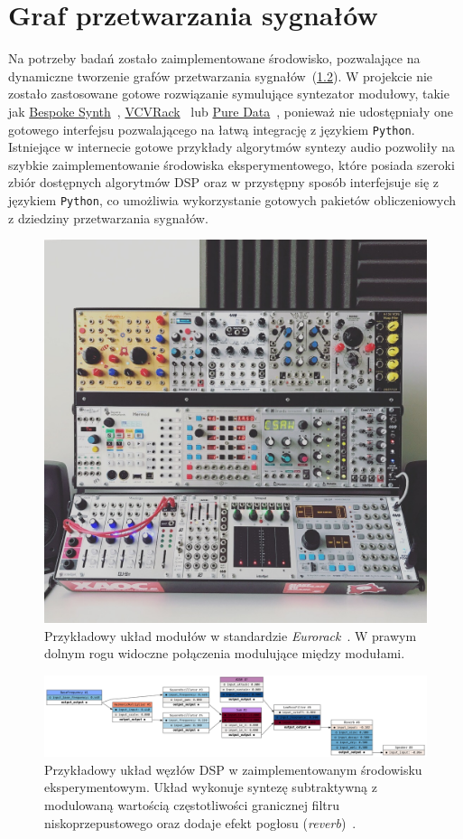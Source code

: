 \chapter{Graf przetwarzania sygnałów} \label{dsp_graph_chapter}

Na potrzeby badań zostało zaimplementowane środowisko, pozwalające na dynamiczne tworzenie grafów przetwarzania
sygnałów~(\ref{fig:example_simple_analog_synth}). W projekcie nie zostało zastosowane gotowe rozwiązanie symulujące syntezator modułowy, takie jak
\href{https://www.bespokesynth.com/}{Bespoke Synth}~\cite{bespoke}, \href{https://vcvrack.com/Rack}{VCVRack}~\cite{vcvrack}
lub \href{https://puredata.info/}{Pure Data}~\cite{pure_data}, ponieważ
nie udostępniały one gotowego interfejsu pozwalającego na łatwą integrację z językiem \texttt{Python}.
Istniejące w internecie gotowe przykłady algorytmów syntezy audio pozwoliły na szybkie zaimplementowanie
środowiska eksperymentowego, które posiada szeroki zbiór dostępnych algorytmów DSP oraz w przystępny sposób
interfejsuje się z językiem \texttt{Python}, co umożliwia wykorzystanie gotowych pakietów obliczeniowych z dziedziny przetwarzania sygnałów.

\begin{figure}[H]
    \centering
    \includegraphics[width=0.4\linewidth]{rys02/eurorack.jpg}
    \caption{
      Przykładowy układ modułów w standardzie \textit{Eurorack}~\cite{eurorack}.
      W prawym dolnym rogu widoczne połączenia modulujące między modułami.
    }
    \label{fig:eurorack_setup}
\end{figure}

\begin{figure}[H]
    \centering
    \includegraphics[width=0.9\linewidth]{rys02/luthier_simple_analog.png}
    \caption{
      Przykładowy układ węzłów DSP w zaimplementowanym środowisku eksperymentowym.
      Układ wykonuje syntezę subtraktywną z modulowaną wartością częstotliwości granicznej filtru niskoprzepustowego
      oraz dodaje efekt pogłosu (\textit{reverb})~\cite{reverb}.
    }
    \label{fig:example_simple_analog_synth}
\end{figure}


